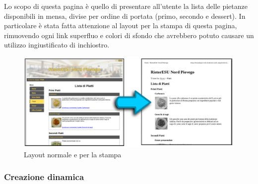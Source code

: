 \documentclass[10pt,a4paper,onecolumn]{article}
\begin{document}
Lo scopo di questa pagina è quello di presentare all’utente la lista delle pietanze disponibili in mensa, divise per ordine di portata (primo, secondo e dessert). In particolare è stata fatta attenzione al layout per la stampa di questa pagina, rimuovendo ogni link superfluo e colori di sfondo che avrebbero potuto causare un utilizzo ingiustificato di inchiostro.

\begin{figure}[h]
\centering
\includegraphics[scale=0.20]{trasformazioneStampa}
\caption{Layout normale e per la stampa}
\label{trasformazioneStampa}
\end{figure}

\subsubsection{Creazione dinamica}
\end{document}
